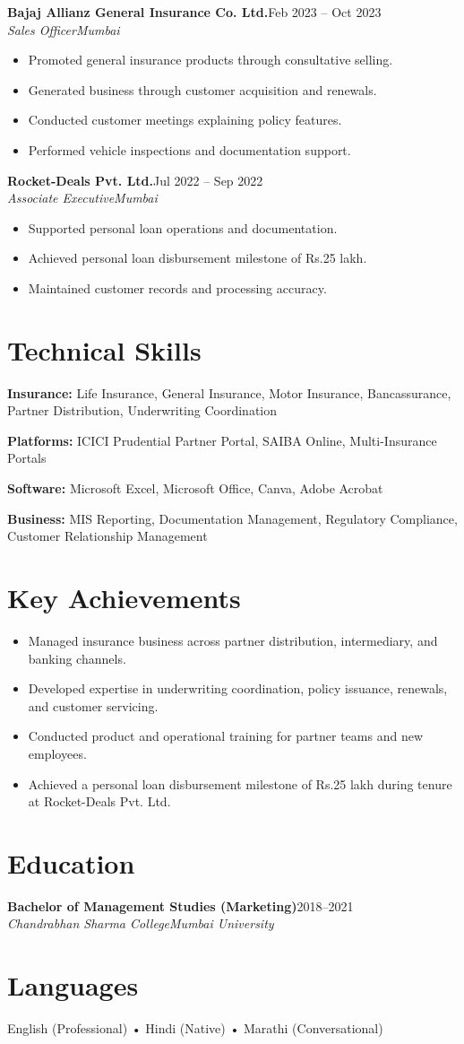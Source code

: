 \documentclass[11pt,a4paper]{article}
\newcommand{\resumeSubheading}[4]{
\textbf{#1}\hfill #2\\[-2pt]
\textit{#3}\hfill \textit{#4}
}
\begin{document}
\resumeSubheading{Bajaj Allianz General Insurance Co. Ltd.}{Feb 2023 -- Oct 2023}{Sales Officer}{Mumbai}
\begin{itemize}[leftmargin=0.28in]
\item Promoted general insurance products through consultative selling.
\item Generated business through customer acquisition and renewals.
\item Conducted customer meetings explaining policy features.
\item Performed vehicle inspections and documentation support.
\end{itemize}

\resumeSubheading{Rocket-Deals Pvt. Ltd.}{Jul 2022 -- Sep 2022}{Associate Executive}{Mumbai}
\begin{itemize}[leftmargin=0.28in]
\item Supported personal loan operations and documentation.
\item Achieved personal loan disbursement milestone of Rs.25 lakh.
\item Maintained customer records and processing accuracy.
\end{itemize}

\section*{Technical Skills}
\textbf{Insurance:} Life Insurance, General Insurance, Motor Insurance, Bancassurance, Partner Distribution, Underwriting Coordination

\textbf{Platforms:} ICICI Prudential Partner Portal, SAIBA Online, Multi-Insurance Portals

\textbf{Software:} Microsoft Excel, Microsoft Office, Canva, Adobe Acrobat

\textbf{Business:} MIS Reporting, Documentation Management, Regulatory Compliance, Customer Relationship Management

\section*{Key Achievements}
\begin{itemize}[leftmargin=0.28in]
\item Managed insurance business across partner distribution, intermediary, and banking channels.
\item Developed expertise in underwriting coordination, policy issuance, renewals, and customer servicing.
\item Conducted product and operational training for partner teams and new employees.
\item Achieved a personal loan disbursement milestone of Rs.25 lakh during tenure at Rocket-Deals Pvt. Ltd.
\end{itemize}

\section*{Education}
\resumeSubheading{Bachelor of Management Studies (Marketing)}{2018--2021}{Chandrabhan Sharma College}{Mumbai University}

\section*{Languages}
English (Professional) \quad • \quad Hindi (Native) \quad • \quad Marathi (Conversational)
\end{document}
